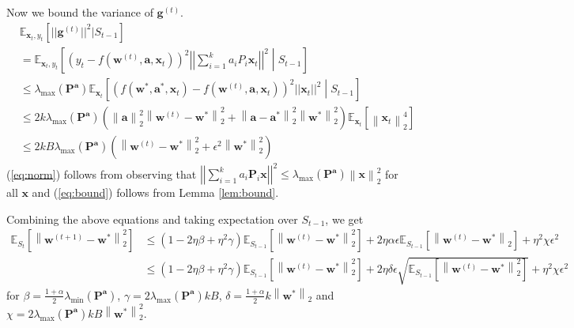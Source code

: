 \documentclass[11pt]{article}
\newcommand{\E}{\mathbb{E}}
\newcommand{\mat}[1]{\mathbf{#1}}
\newcommand{\vect}[1]{\mathbf{#1}}
\newcommand{\norm}[1]{\left\|#1\right\|}
\begin{document}
Now we bound the variance of $\vect{g}^{\left(t\right)}$.
\begin{align}
&\E_{\vect{x}_t, y_t}[||\vect{g}^{\left(t\right)}||^2|S_{t-1}] \nonumber\\
&= \E_{\vect{x}_t, y_t}\left[\left(y_t - f\left(\vect{w}^{\left(t\right)}, \vect{a}, \vect{x}_t\right)\right)^2  \left|\left|\sum_{i=1}^k a_i P_i  \vect{x}_t\right|\right|^2 \middle| S_{t-1}\right]\nonumber\\
&\leq \lambda_{\max}\left(\mat{P}^{\vect{a}}\right) \E_{\vect{x}_t}\left[\left(f\left(\vect{w}^*, \vect{a}^*, \vect{x}_t\right) - f\left(\vect{w}^{\left(t\right)}, \vect{a}, \vect{x}_t\right)\right)^2||\vect{x}_t||^2 \middle| S_{t-1}\right]\label{eq:norm}\\
&\leq 2k \lambda_{\max}\left(\mat{P}^{\vect{a}}\right) \left(\norm{\vect{a}}_2^2\norm{\vect{w}^{\left(t\right)} - \vect{w}^*}_2^2 + \norm{\vect{a} - \vect{a}^*}_2^2\norm{\vect{w}^*}_2^2\right)\E_{\vect{x}_t}\left[\norm{\vect{x}_t}_2^4\right]\label{eq:bound}\\
&\leq 2kB\lambda_{\max}\left(\mat{P}^{\vect{a}}\right) \left(\norm{\vect{w}^{\left(t\right)} - \vect{w}^*}_2^2 + \epsilon^2\norm{\vect{w}^*}_2^2\right)
\end{align}
(\ref{eq:norm}) follows from observing that $\left|\left|\sum_{i=1}^k a_i \mat{P}_i \vect{x}\right|\right|^2 \leq \lambda_{\max}\left(\mat{P}^\vect{a}\right) \norm{\vect{x}}_2^2$ for all $\vect{x}$ and (\ref{eq:bound}) follows from Lemma \ref{lem:bound}.

Combining the above equations and taking expectation over $S_{t-1}$, we get 
\begin{align*}
\E_{S_t}[\norm{\vect{w}^{\left(t+1\right)} - \vect{w}^*}_2^2] &\leq \left(1 - 2\eta \beta + \eta^2 \gamma\right)\E_{S_{t-1}}[\norm{\vect{w}^{\left(t\right)} - \vect{w}^*}_2^2] + 2\eta\alpha \epsilon \E_{S_{t-1}}[\norm{\vect{w}^{\left(t\right)} - \vect{w}^*}_2] + \eta^2 \chi \epsilon^2\\
&\leq \left(1 - 2\eta \beta + \eta^2 \gamma\right)\E_{S_{t-1}}[\norm{\vect{w}^{\left(t\right)} - \vect{w}^*}_2^2] + 2\eta\delta \epsilon \sqrt{\E_{S_{t-1}}[\norm{\vect{w}^{\left(t\right)} - \vect{w}^*}_2^2]} + \eta^2 \chi \epsilon^2
\end{align*}
for $\beta = \frac{1 + \alpha}{2}\lambda_{\min}\left(\mat{P}^{\vect{a}}\right)$, $\gamma = 2\lambda_{\max}\left(\mat{P}^{\vect{a}}\right) k B$, $\delta = \frac{1 + \alpha}{2} k\norm{\vect{w}^*}_2$ and $\chi = 2\lambda_{\max}\left(\mat{P}^{\vect{a}}\right) k B \norm{\vect{w}^*}_2^2$. 
\end{document}
